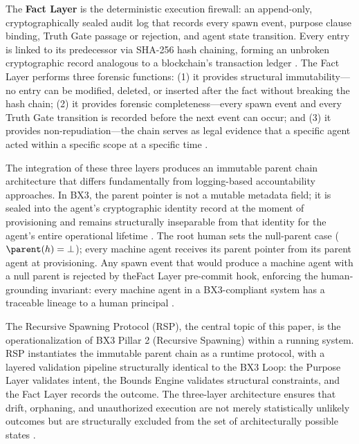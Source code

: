 The \textbf{Fact Layer} is the deterministic execution firewall: an append-only, cryptographically sealed audit log that records every spawn event, purpose clause binding, Truth Gate passage or rejection, and agent state transition. Every entry is linked to its predecessor via SHA-256 hash chaining, forming an unbroken cryptographic record analogous to a blockchain's transaction ledger \cite{nakamoto2008bitcoin}. The Fact Layer performs three forensic functions: (1) it provides structural immutability---no entry can be modified, deleted, or inserted after the fact without breaking the hash chain; (2) it provides forensic completeness---every spawn event and every Truth Gate transition is recorded before the next event can occur; and (3) it provides non-repudiation---the chain serves as legal evidence that a specific agent acted within a specific scope at a specific time \cite{bailoutprotocol2026}.

The integration of these three layers produces an immutable parent chain architecture that differs fundamentally from logging-based accountability approaches. In BX3, the parent pointer is not a mutable metadata field; it is sealed into the agent's cryptographic identity record at the moment of provisioning and remains structurally inseparable from that identity for the agent's entire operational lifetime \cite{sovereignagent}. The root human sets the null-parent case ($\parent(h) = \bot$); every machine agent receives its parent pointer from its parent agent at provisioning. Any spawn event that would produce a machine agent with a null parent is rejected by theFact Layer pre-commit hook, enforcing the human-grounding invariant: every machine agent in a BX3-compliant system has a traceable lineage to a human principal \cite{bx3framework2026}.

The Recursive Spawning Protocol (RSP), the central topic of this paper, is the operationalization of BX3 Pillar 2 (Recursive Spawning) within a running system. RSP instantiates the immutable parent chain as a runtime protocol, with a layered validation pipeline structurally identical to the BX3 Loop: the Purpose Layer validates intent, the Bounds Engine validates structural constraints, and the Fact Layer records the outcome. The three-layer architecture ensures that drift, orphaning, and unauthorized execution are not merely statistically unlikely outcomes but are structurally excluded from the set of architecturally possible states \cite{RecursiveSpawning_Sections_6_7_vFinal}.
